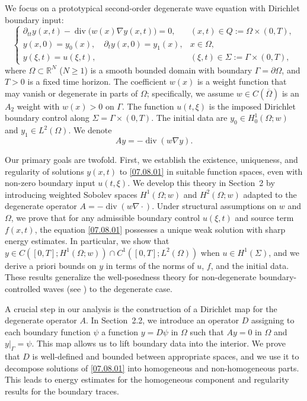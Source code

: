 \documentclass[preprint,12pt]{elsarticle}
\theoremstyle{definition}   %
\numberwithin{equation}{section}
\begin{document}
We focus on a prototypical second-order degenerate wave equation with Dirichlet boundary input:
\begin{equation}
\begin{cases}
\partial_{tt}y(x,t) - \operatorname{div}\!\big(w(x)\nabla y(x,t)\big) = 0, & (x,t)\in Q:=\Omega\times(0,T),\\
y(x,0) = y_0(x),\quad \partial_t y(x,0) = y_1(x), & x\in \Omega,\\
y(\xi, t) = u(\xi, t), & (\xi,t)\in \Sigma:=\Gamma\times(0,T),
\end{cases}
\label{07.08.01}
\end{equation}
where $\Omega\subset \mathbb{R}^N$ ($N\ge 1$) is a smooth bounded domain with boundary $\Gamma = \partial\Omega$, and $T>0$ is a fixed time horizon. The coefficient $w(x)$ is a weight function that may vanish or degenerate in parts of $\Omega$; specifically, we assume $w\in C(\overline{\Omega})$ is an $A_2$ weight with $w(x)>0$ on $\Gamma$. The function $u(t,\xi)$ is the imposed Dirichlet boundary control along $\Sigma = \Gamma \times (0,T)$. The initial data are $y_0 \in H^1_0(\Omega;w)$ and $y_1 \in L^2(\Omega)$. We denote
\begin{equation}
Ay = - \operatorname{div}(w\nabla y).
\label{07.08.02}
\end{equation}

Our primary goals are twofold. First, we establish the existence, uniqueness, and regularity of solutions $y(x,t)$ to \eqref{07.08.01} in suitable function spaces, even with non-zero boundary input $u(t,\xi)$. We develop this theory in Section~2 by introducing weighted Sobolev spaces $H^1(\Omega;w)$ and $H^2(\Omega;w)$ adapted to the degenerate operator $A = -\operatorname{div}(w\nabla\cdot)$. Under structural assumptions on $w$ and $\Omega$, we prove that for any admissible boundary control $u(\xi, t)$ and source term $f(x,t)$, the equation \eqref{07.08.01} possesses a unique weak solution with sharp energy estimates. In particular, we show that $y \in C([0,T];H^1(\Omega;w)) \cap C^1([0,T];L^2(\Omega))$ when $u\in H^1(\Sigma)$, and we derive a priori bounds on $y$ in terms of the norms of $u$, $f$, and the initial data. These results generalize the well-posedness theory for non-degenerate boundary-controlled waves (see \cite{Lions}) to the degenerate case.

A crucial step in our analysis is the construction of a Dirichlet map for the degenerate operator $A$. In Section~2.2, we introduce an operator $D$ assigning to each boundary function $\psi$ a function $y=D\psi$ in $\Omega$ such that $Ay=0$ in $\Omega$ and $y|_{\Gamma}=\psi$. This map allows us to lift boundary data into the interior. We prove that $D$ is well-defined and bounded between appropriate spaces, and we use it to decompose solutions of \eqref{07.08.01} into homogeneous and non-homogeneous parts. This leads to energy estimates for the homogeneous component and regularity results for the boundary traces.
\end{document}

